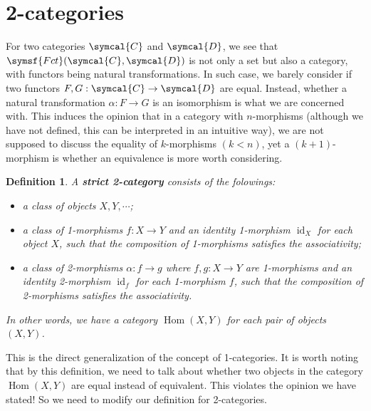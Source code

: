 \documentclass{article}
\theoremstyle{theorem}
\newtheorem{definition}{Definition}[section]
\theoremstyle{remark}
\def\calC{{\symcal{C}}}
\def\calD{{\symcal{D}}}
\DeclareMathOperator{\Hom}{Hom}
\DeclareMathOperator{\id}{id}
\begin{document}
\section{2-categories}

For two categories $\calC$ and $\calD$, we see that $\symsf{Fct}(\calC, \calD)$ is not only a set but also a category, with functors being natural transformations. In such case, we barely consider if two functors $F, G : \calC \to \calD$ are equal. Instead, whether a natural transformation $\alpha : F \to G$ is an isomorphism is what we are concerned with. This induces the opinion that in a category with $n$-morphisms (although we have not defined, this can be interpreted in an intuitive way), we are not supposed to discuss the equality of $k$-morphisms $(k < n)$, yet a $(k+1)$-morphism is whether an equivalence is more worth considering. 

\begin{definition}
    A \textbf{strict 2-category} consists of the folowings:
    \begin{itemize}
        \item a class of objects $X, Y, \cdots$;
        \item a class of 1-morphisms $f : X \to Y$ and an identity 1-morphism $\id_X$ for each object $X$, such that the composition of 1-morphisms satisfies the associativity;
        \item a class of 2-morphisms $\alpha : f \to g$ where $f, g : X \to Y$ are 1-morphisms and an identity 2-morphism $\id_f$ for each 1-morphism $f$, such that the composition of 2-morphisms satisfies the associativity.
    \end{itemize}
    In other words, we have a category $\Hom(X, Y)$ for each pair of objects $(X, Y)$. 
\end{definition}

This is the direct generalization of the concept of 1-categories. It is worth noting that by this definition, we need to talk about whether two objects in the category $\Hom(X, Y)$ are equal instead of equivalent. This violates the opinion we have stated! So we need to modify our definition for 2-categories. 
\end{document}
